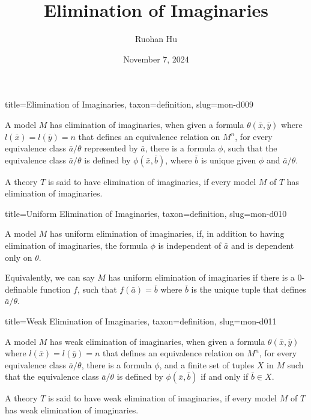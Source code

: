 \documentclass[a4paper]{article}
\title{Elimination of Imaginaries}
\date{November 7, 2024}
\author{Ruohan Hu}
\begin{document}
\maketitle

\begin{tree}{title={Elimination of Imaginaries}, taxon={definition}, slug={mon-d009}}

    A model \(M\) has elimination of imaginaries, when given a formula \(\theta ( \bar {x}, \bar {y})\) where \(l( \bar {x})=l( \bar {y})=n\) that defines an equivalence relation on \(M^n\), for every equivalence class \(\bar {a}/ \theta\) represented by \(\bar {a}\), there is a formula \(\phi\), such that the equivalence class \(\bar {a}/ \theta\) is defined by \(\phi ( \bar {x}, \bar {b})\), where \(\bar {b}\) is unique given \(\phi\) and \(\bar {a}/ \theta\).

    A theory \(T\) is said to have elimination of imaginaries, if every model \(M\) of \(T\) has elimination of imaginaries.

\end{tree}

\begin{tree}{title={Uniform Elimination of Imaginaries}, taxon={definition}, slug={mon-d010}}

    A model \(M\) has uniform elimination of imaginaries, if, in addition to having elimination of imaginaries, the formula \(\phi\) is independent of \(\bar {a}\) and is dependent only on \(\theta\). 
    
    Equivalently, we can say $M$ has uniform elimination of imaginaries if there is a $0$-definable function \(f\), such that \(f( \bar {a})= \bar {b}\) where \(\bar {b}\) is the unique tuple that defines \(\bar {a}/ \theta\).

\end{tree}

\begin{tree}{title={Weak Elimination of Imaginaries}, taxon={definition}, slug={mon-d011}}
  
    A model \(M\) has weak elimination of imaginaries, when given a formula \(\theta ( \bar {x}, \bar {y})\) where \(l( \bar {x})=l( \bar {y})=n\) that defines an equivalence relation on \(M^n\), for every equivalence class \(\bar {a}/ \theta\), there is a formula \(\phi\), and a finite set of tuples \(X\) in \(M\) such that the equivalence class \(\bar {a}/ \theta\) is defined by \(\phi ( \bar {x}, \bar {b})\) if and only if \(\bar {b} \in  X\).
    
    A theory \(T\) is said to have weak elimination of imaginaries, if every model \(M\) of \(T\) has weak elimination of imaginaries.

\end{tree}

\printbibliography
\end{document}
